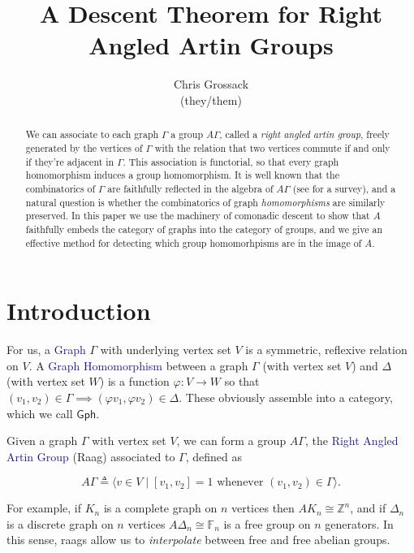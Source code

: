 \documentclass[12pt]{article}
\author{Chris Grossack\\ (they/them)}
\title{A Descent Theorem for Right Angled Artin Groups}
\theoremstyle{definition}
\theoremstyle{theorem}
\newcommand{\teq}{\triangleq}
\newcommand*{\important}[1]{\textcolor{MidnightBlue}{#1}}
\begin{document}
\maketitle

\begin{abstract}
  We can associate to each graph $\Gamma$ a group $A\Gamma$, called a
  \emph{right angled artin group}, freely generated by the vertices
  of $\Gamma$ with the relation that two vertices commute if and only if 
  they're adjacent in $\Gamma$. This association is functorial, so that 
  every graph homomorphism induces a group homomorphism. 
  It is well known that the combinatorics of $\Gamma$ are faithfully
  reflected in the algebra of $A\Gamma$ 
  (see \cite{koberdaGeometryCombinatoricsRightangled2021} for a survey),
  and a natural question is whether the combinatorics of graph \emph{homomorphisms}
  are similarly preserved.
  In this paper we use the machinery of comonadic descent to show that 
  $A$ faithfully embeds the category of graphs into the category of groups,
  and we give an effective method for detecting which group homomorhpisms 
  are in the image of $A$.
\end{abstract}

\section{Introduction}
\label{intro}

  For us, a \important{Graph} $\Gamma$ with underlying vertex set $V$ is a 
  symmetric, reflexive relation on $V$. A \important{Graph Homomorphism} between 
  a graph $\Gamma$ (with vertex set $V$) and $\Delta$ (with vertex set $W$) is a 
  function $\varphi : V \to W$ so that $(v_1, v_2) \in \Gamma \implies (\varphi v_1, \varphi v_2) \in \Delta$.
  These obviously assemble into a category, which we call $\mathsf{Gph}$.

  Given a graph $\Gamma$ with vertex set $V$, we can form a group $A\Gamma$, the 
  \important{Right Angled Artin Group} (Raag) associated to $\Gamma$, defined as

  \[ A\Gamma \teq \langle v \in V \mid [v_1, v_2] = 1 \text{ whenever } (v_1,v_2) \in \Gamma \rangle .\]

  For example, if $K_n$ is a complete graph on $n$ vertices then 
  $AK_n \cong \mathbb{Z}^n$, and if $\Delta_n$ is a discrete graph on $n$ vertices
  $A\Delta_n \cong \mathbb{F}_n$ is a free group on $n$ generators. 
  In this sense, raags allow us to \emph{interpolate} between free and free
  abelian groups.
\end{document}
